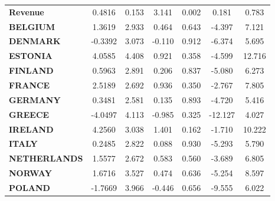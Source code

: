 \documentclass[ 11pt]{article}
\begin{document}
\begin{center}
\begin{longtable}{lcccccc}
\textbf{Revenue}                                           &       0.4816  &        0.153     &     3.141  &         0.002        &        0.181    &        0.783     \\
\textbf{BELGIUM}                                           &       1.3619  &        2.933     &     0.464  &         0.643        &       -4.397    &        7.121     \\
\textbf{DENMARK}                                           &      -0.3392  &        3.073     &    -0.110  &         0.912        &       -6.374    &        5.695     \\
\textbf{ESTONIA}                                           &       4.0585  &        4.408     &     0.921  &         0.358        &       -4.599    &       12.716     \\
\textbf{FINLAND}                                           &       0.5963  &        2.891     &     0.206  &         0.837        &       -5.080    &        6.273     \\
\textbf{FRANCE}                                            &       2.5189  &        2.692     &     0.936  &         0.350        &       -2.767    &        7.805     \\
\textbf{GERMANY}                                           &       0.3481  &        2.581     &     0.135  &         0.893        &       -4.720    &        5.416     \\
\textbf{GREECE}                                            &      -4.0497  &        4.113     &    -0.985  &         0.325        &      -12.127    &        4.027     \\
\textbf{IRELAND}                                           &       4.2560  &        3.038     &     1.401  &         0.162        &       -1.710    &       10.222     \\
\textbf{ITALY}                                             &       0.2485  &        2.822     &     0.088  &         0.930        &       -5.293    &        5.790     \\
\textbf{NETHERLANDS}                                       &       1.5577  &        2.672     &     0.583  &         0.560        &       -3.689    &        6.805     \\
\textbf{NORWAY}                                            &       1.6716  &        3.527     &     0.474  &         0.636        &       -5.254    &        8.597     \\
\textbf{POLAND}                                            &      -1.7669  &        3.966     &    -0.446  &         0.656        &       -9.555    &        6.022     \\

\end{longtable}
\end{center}
\end{document}
